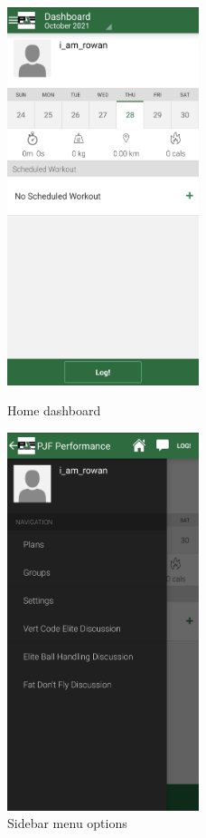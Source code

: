 \begin{figure}[H]
    \centering
    \begin{minipage}{0.5\textwidth}
        \centering
        \includegraphics[width=0.5\textwidth]{pjf/pjf-dashboard.jpeg}
        \caption{Home dashboard}
        \label{fig:pjf-home}
    \end{minipage}%
    \begin{minipage}{0.5\textwidth}
        \centering
        \includegraphics[width=0.5\textwidth]{pjf/pjf-menu.jpeg}
        \caption{Sidebar menu options}
        \label{fig:pjf-menu}
    \end{minipage}%
\end{figure}